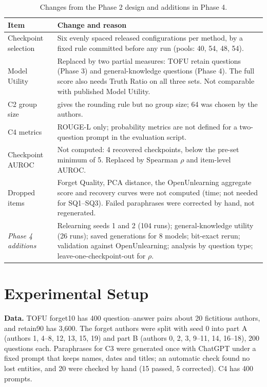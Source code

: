 \documentclass[conference]{IEEEtran}
\begin{document}
\begin{table}[t]
\caption{Changes from the Phase 2 design and additions in Phase 4.}
\label{tab:changes}
\centering
\scriptsize
\setlength{\tabcolsep}{2.5pt}
\begin{tabular}{@{}L{2.35cm}L{5.5cm}@{}}
\toprule
Item & Change and reason \\
\midrule
Checkpoint selection & Six evenly spaced released configurations per method, by a fixed rule committed before any run (pools: 40, 54, 48, 54). \\
Model Utility & Replaced by two partial measures: TOFU retain questions (Phase 3) and general-knowledge questions (Phase 4). The full score also needs Truth Ratio on all three sets. Not comparable with published Model Utility. \\
C2 group size & \cite{zhang2025quant} gives the rounding rule but no group size; 64 was chosen by the authors. \\
C4 metrics & ROUGE-L only; probability metrics are not defined for a two-question prompt in the evaluation script. \\
Checkpoint AUROC & Not computed: 4 recovered checkpoints, below the pre-set minimum of 5. Replaced by Spearman $\rho$ and item-level AUROC. \\
Dropped items & Forget Quality, PCA distance, the OpenUnlearning aggregate score and recovery curves were not computed (time; not needed for SQ1--SQ3). Failed paraphrases were corrected by hand, not regenerated. \\
\midrule
\emph{Phase 4 additions} & Relearning seeds 1 and 2 (104 runs); general-knowledge utility (26 runs); saved generations for 8 models; bit-exact rerun; validation against OpenUnlearning; analysis by question type; leave-one-checkpoint-out for $\rho$. \\
\bottomrule
\end{tabular}
\end{table}

\section{Experimental Setup}\label{sec:setup}
\textbf{Data.} TOFU \cite{maini2024tofu} forget10 has 400 question--answer pairs about 20 fictitious authors, and retain90 has 3,600. The forget authors were split with seed 0 into part A (authors 1, 4--8, 12, 13, 15, 19) and part B (authors 0, 2, 3, 9--11, 14, 16--18), 200 questions each. Paraphrases for C3 were generated once with ChatGPT under a fixed prompt that keeps names, dates and titles; an automatic check found no lost entities, and 20 were checked by hand (15 passed, 5 corrected). C4 has 400 prompts.
\end{document}
